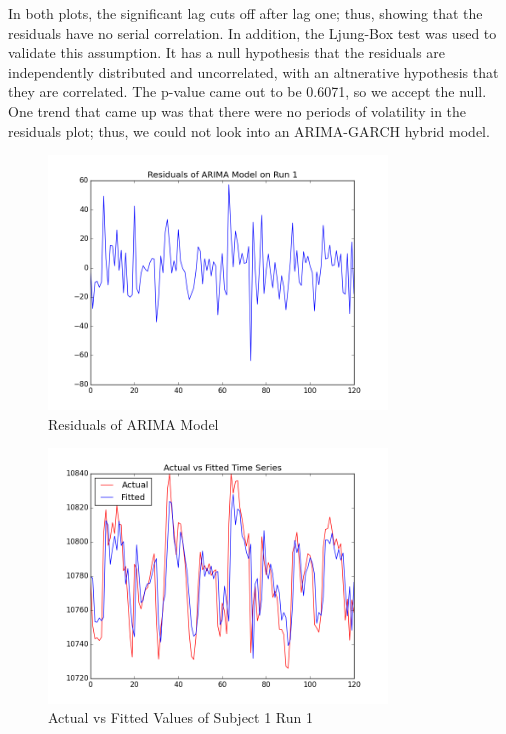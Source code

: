 \documentclass[11pt,twocolumn]{article}
\begin{document}
In both plots, the significant lag cuts off after lag one;
thus, showing that the residuals have no serial correlation. In addition, the
Ljung-Box test was used to validate this assumption. It has a null hypothesis
that the residuals are independently distributed and uncorrelated, with an
altnerative hypothesis that they are correlated. The p-value came out to be
0.6071, so we accept the null. One trend that came up was that there were
no periods of volatility in the residuals plot; thus, we could not look into
an ARIMA-GARCH hybrid model.

\begin{figure}[h!]                                                              
\centering                                                                      
\includegraphics[width=90mm]{sub001_run001_residFit.png}                   
\caption{Residuals of ARIMA Model}                                    
\end{figure}

\begin{figure}[h!]                                                              
\centering                                                                      
\includegraphics[width=90mm]{AFTS.png}                   
\caption{Actual vs Fitted Values of Subject 1 Run 1}                                    
\end{figure}
\end{document}

